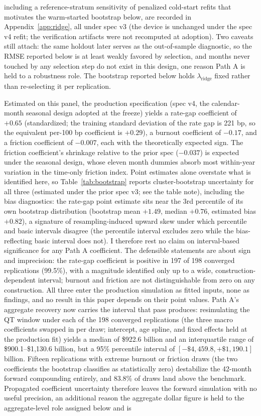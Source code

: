 \documentclass[12pt]{article}
\begin{document}
including a reference-stratum sensitivity of penalized cold-start refits that motivates the warm-started bootstrap below, are recorded in Appendix~\ref{app:ridge}, all under spec v3 (the device is unchanged under the spec v4 refit; the verification artifacts were not recomputed at adoption). Two caveats still attach: the same holdout later serves as the out-of-sample diagnostic, so the RMSE reported below is at least weakly favored by selection, and months never touched by any selection step do not exist in this design, one reason Path A is held to a robustness role. The bootstrap reported below holds $\lambda_{\mathrm{ridge}}$ fixed rather than re-selecting it per replication.

Estimated on this panel, the production specification (spec v4, the calendar-month seasonal design adopted at the freeze) yields a rate-gap coefficient of $+0.65$ (standardized; the training standard deviation of the rate gap is 221 bp, so the equivalent per-100 bp coefficient is $+0.29$), a burnout coefficient of $-0.17$, and a friction coefficient of $-0.007$, each with the theoretically expected sign. The friction coefficient's shrinkage relative to the prior spec ($-0.037$) is expected under the seasonal design, whose eleven month dummies absorb most within-year variation in the time-only friction index. Point estimates alone overstate what is identified here, so Table~\ref{tab:bootstrap} reports cluster-bootstrap uncertainty for all three (estimated under the prior spec v3; see the table note), including the bias diagnostics: the rate-gap point estimate sits near the 3rd percentile of its own bootstrap distribution (bootstrap mean $+1.49$, median $+0.76$, estimated bias $+0.82$), a signature of resampling-induced upward skew under which percentile and basic intervals disagree (the percentile interval excludes zero while the bias-reflecting basic interval does not). I therefore rest no claim on interval-based significance for any Path A coefficient. The defensible statements are about sign and imprecision: the rate-gap coefficient is positive in 197 of 198 converged replications (99.5\%), with a magnitude identified only up to a wide, construction-dependent interval; burnout and friction are not distinguishable from zero on any construction. All three enter the production simulation as fitted inputs, none as findings, and no result in this paper depends on their point values. Path A's aggregate recovery now carries the interval that pass produces: resimulating the QT window under each of the 198 converged replications (the three macro coefficients swapped in per draw; intercept, age spline, and fixed effects held at the production fit) yields a median of \$922.6 billion and an interquartile range of \$900.1--\$1{,}130.6 billion, but a 95\% percentile interval of $[-\$4{,}459.8, +\$1{,}190.1]$ billion. Fifteen replications with extreme burnout or friction draws (the two coefficients the bootstrap classifies as statistically zero) destabilize the 42-month forward compounding entirely, and 83.8\% of draws land above the benchmark. Propagated coefficient uncertainty therefore leaves the forward simulation with no useful precision, an additional reason the aggregate dollar figure is held to the aggregate-level role assigned below and is 
\end{document}
